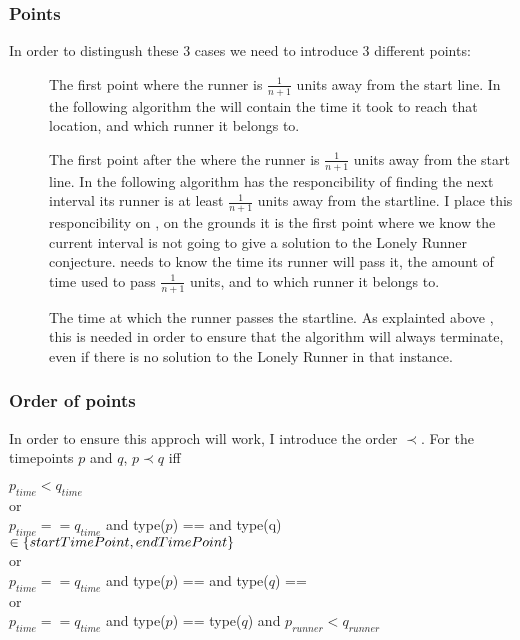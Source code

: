 \subsubsection{Points}

In order to distingush these 3 cases we need to introduce 3 different points:
\begin{description}
\item[\comStart] The first point where the runner is $\frac{1}{n + 1}$ units away from the start line. In the following algorithm the \comStart will contain the time it took to reach that location, and which runner it belongs to.
\item[\comEnd] The first point after the \comStart where the runner is $\frac{1}{n + 1}$ units away from the start line. In the following algorithm \comEnd has the responcibility of finding the next interval its runner is at least $\frac{1}{n+1}$ units away from the startline. I place this responcibility on \comEnd, on the grounds it is the first point where we know the current interval is not going to give a solution to the Lonely Runner conjecture. \comEnd needs to know the time its runner will pass it, the amount of time used to pass $\frac{1}{n+1}$ units, and to which runner it belongs to.
\item[\comFin] The time at which the runner passes the startline. As explainted above , this is needed in order to ensure that the algorithm will always terminate, even if there is no solution to the Lonely Runner in that instance.
\end{description}

\subsubsection{Order of points}
In order to ensure this approch will work, I introduce the order $\prec$. For the timepoints $p$ and $q$, $p \prec q$ iff \\

\begin{center}
$p_{time} < q_{time}$\\
or \\
$p_{time} == q_{time}$ and type($p$) == \comFin and type(q) $\in \{startTimePoint, endTimePoint\}$\\
or \\
$p_{time} == q_{time}$ and type($p$) == \comStart and type($q$) == \comEnd \\
or \\
$p_{time} == q_{time}$ and type($p$) == type($q$) and $p_{runner} < q_{runner}$
\end{center}


